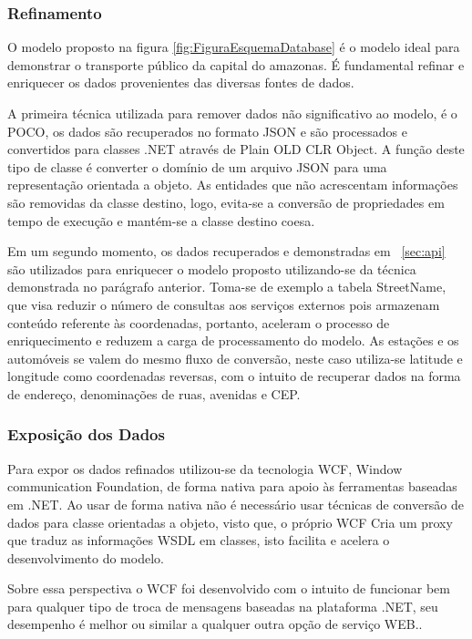 \documentclass[12pt]{article}
\begin{document}
\subsubsection{Refinamento} \label{sec:REFINA}
O modelo proposto na figura \ref{fig:FiguraEsquemaDatabase} é o modelo ideal para demonstrar o transporte público da capital do amazonas. É fundamental refinar e enriquecer os dados provenientes das diversas fontes de dados.

A primeira técnica utilizada para remover dados não significativo ao modelo, é o POCO,
os dados são recuperados no formato JSON e são processados e convertidos para classes .NET através de Plain OLD CLR Object. A função deste tipo de classe é converter o domínio de um arquivo JSON para uma representação orientada a objeto. As entidades que não acrescentam informações são removidas da classe destino, logo, evita-se a conversão de propriedades em tempo de execução e mantém-se a classe destino coesa.  

Em um segundo momento, os dados recuperados e demonstradas em ~\ref{sec:api} são utilizados para enriquecer o modelo proposto utilizando-se da técnica demonstrada no parágrafo anterior. Toma-se de exemplo a tabela StreetName, que visa reduzir o número de consultas aos serviços externos pois armazenam conteúdo referente às coordenadas, portanto, aceleram o processo de enriquecimento e reduzem a carga de processamento do modelo. As estações e os automóveis se valem do mesmo fluxo de conversão, neste caso utiliza-se latitude e longitude como coordenadas reversas, com o intuito de recuperar dados na forma de endereço, denominações de ruas, avenidas e CEP.

\subsubsection{Exposição dos Dados} \label{sec:WCFExpo}
Para expor os dados refinados utilizou-se da tecnologia WCF, Window communication Foundation, de forma nativa para apoio às ferramentas baseadas em .NET. Ao usar de forma nativa não é necessário usar técnicas de conversão de dados para classe orientadas a objeto, visto que, o próprio WCF Cria um proxy que traduz as informações WSDL em classes, isto facilita e acelera o desenvolvimento do modelo.

Sobre essa perspectiva o WCF foi desenvolvido com o intuito de funcionar bem para qualquer tipo de troca de mensagens baseadas na plataforma .NET, seu desempenho é melhor ou similar a qualquer outra opção de serviço WEB.\cite{art07}.
\end{document}

